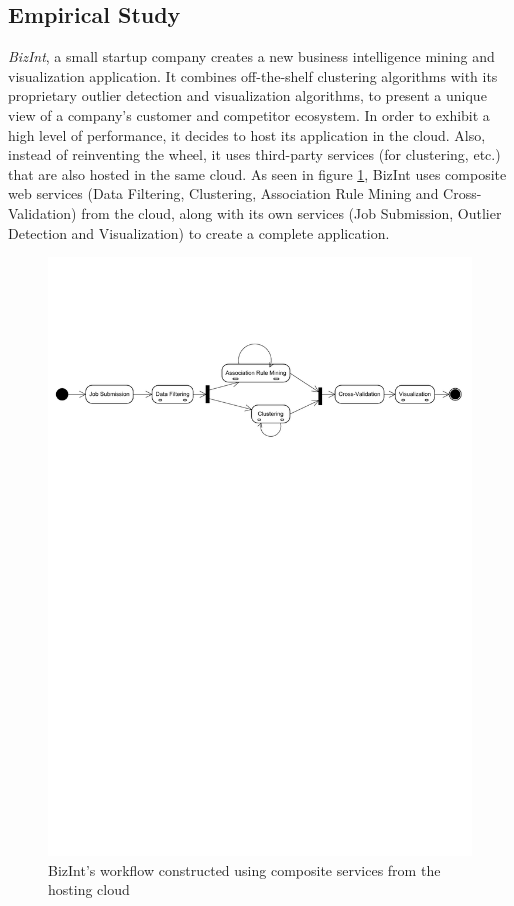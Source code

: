 \documentclass[10pt,journal,compsoc]{IEEEtran}
\begin{document}
\subsection{Empirical Study}
\textit{BizInt}, a small startup company creates a new business intelligence mining and visualization application.  It combines off-the-shelf clustering algorithms with its proprietary outlier detection and visualization algorithms, to present a unique view of a company's customer and competitor ecosystem. In order to exhibit a high level of performance, it decides to host its application in the cloud. Also, instead of reinventing the wheel, it uses third-party services (for clustering, etc.) that are also hosted in the same cloud. As seen in figure \ref{fig:BizIntWorkflow}, BizInt uses composite web services (Data Filtering, Clustering, Association Rule Mining and Cross-Validation) from the cloud, along with its own services (Job Submission, Outlier Detection and Visualization) to create a complete application.
\begin{figure}%
\includegraphics[scale=0.4, clip, trim=0 20cm 0 4cm]{drawings/BizIntWorkflow.pdf}%
\caption{BizInt's workflow constructed using composite services from the hosting cloud\label{fig:BizIntWorkflow}}%
\end{figure}
\end{document}
